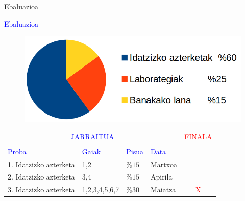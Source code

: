 \documentclass[
 10pt,%
 compress,%
 t,       %
 xcolor=svgnames
]{beamer}
\theoremstyle{definition} \newtheorem{definicion}{Definicion}[section]
\theoremstyle{propiedades} \newtheorem{propiedades}{Propiedades}[section]
\begin{document}
\begin{frame}{Ebaluazioa}
	

\medskip

\centering \textcolor{blue}{Ebaluazioa}

\medskip

\begin{figure}
	\centering
	\begin{minipage}{.8\textwidth}
		\colorbox{white}  {\includegraphics[width=0.8\linewidth]{Kalifikazio_portzentaia}}
	\end{minipage}
\end{figure}



\footnotesize
\begin{table} [h!]
	\centering
	\begin{tabular}{l l l l c} 
		\multicolumn{4}{c}{\textcolor{blue}{JARRAITUA}} & \textcolor{red}{FINALA} \\ \\
		\textcolor{blue}{Proba}  & \textcolor{blue}{Gaiak}         & \textcolor{blue}{Pisua}  &  \textcolor{blue}{Data} &  \\    
		\hline 
		1. Idatzizko azterketa       & 1,2            & $\%15$  & Martxoa &    \\
		2. Idatzizko azterketa       & 3,4            & $\%15$  & Apirila &   \\
		3. Idatzizko azterketa       & 1,2,3,4,5,6,7  & $\%30$  & Maiatza &  \textcolor{red}{X}  \\
	\end{tabular}
\end{table}



\end{frame}
\end{document}
